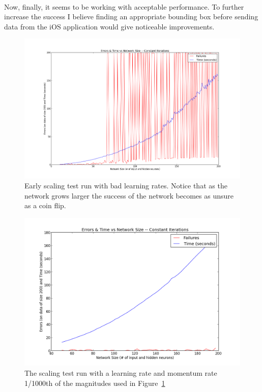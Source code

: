 \documentclass{article}
\begin{document}
    \paragraph{}Now, finally, it seems to be working with acceptable
    performance. To further increase the success I believe finding an 
    appropriate bounding box before sending data from the iOS 
    application would give noticeable improvements.

    \begin{figure}
        \centering
        \includegraphics[scale=0.3]{images/bad_learning.png}
        \caption{Early scaling test run with bad learning rates. Notice that
            as the network grows larger the success of the network becomes as
            unsure as a coin flip.}
        \label{badgraph}
    \end{figure}

    \begin{figure}
        \centering
        \includegraphics[scale=0.5]{images/good_learning.png}
        \caption{The scaling test run with a learning rate and momentum rate 
            1/1000th of the magnitudes used in Figure~\ref{badgraph}}
        \label{goodgraph}
    \end{figure}
\end{document}
